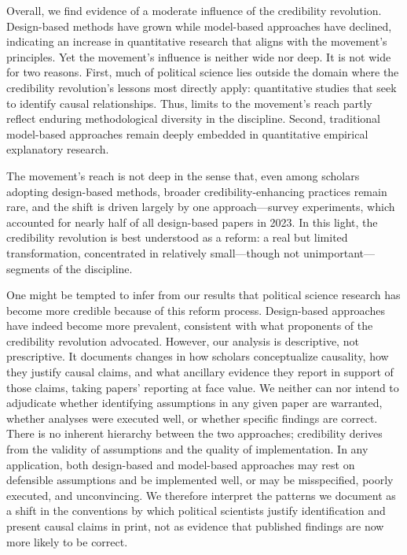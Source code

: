 \documentclass[12pt]{article}
\begin{document}
Overall, we find evidence of a moderate influence of the credibility revolution. Design-based methods have grown while model-based approaches have declined, indicating an increase in quantitative research that aligns with the movement’s principles. Yet the movement's influence is neither wide nor deep. It is not wide for two reasons. First, much of political science lies outside the domain where the credibility revolution's lessons most directly apply: quantitative studies that seek to identify causal relationships. Thus, limits to the movement's reach partly reflect enduring methodological diversity in the discipline. Second, traditional model-based approaches remain deeply embedded in quantitative empirical explanatory research. 

The movement's reach is not deep in the sense that, even among scholars adopting design-based methods, broader credibility-enhancing practices remain rare, and the shift is driven largely by one approach—survey experiments, which accounted for nearly half of all design-based papers in 2023. In this light, the credibility revolution is best understood as a reform: a real but limited transformation, concentrated in relatively small—though not unimportant—segments of the discipline.

One might be tempted to infer from our results that political science research has become more credible because of this reform process. Design-based approaches have indeed become more prevalent, consistent with what proponents of the credibility revolution advocated. However, our analysis is descriptive, not prescriptive. It documents changes in how scholars conceptualize causality, how they justify causal claims, and what ancillary evidence they report in support of those claims, taking papers’ reporting at face value. We neither can nor intend to adjudicate whether identifying assumptions in any given paper are warranted, whether analyses were executed well, or whether specific findings are correct. There is no inherent hierarchy between the two approaches; credibility derives from the validity of assumptions and the quality of implementation. In any application, both design-based and model-based approaches may rest on defensible assumptions and be implemented well, or may be misspecified, poorly executed, and unconvincing. We therefore interpret the patterns we document as a shift in the conventions by which political scientists justify identification and present causal claims in print, not as evidence that published findings are now more likely to be correct.
\end{document}
